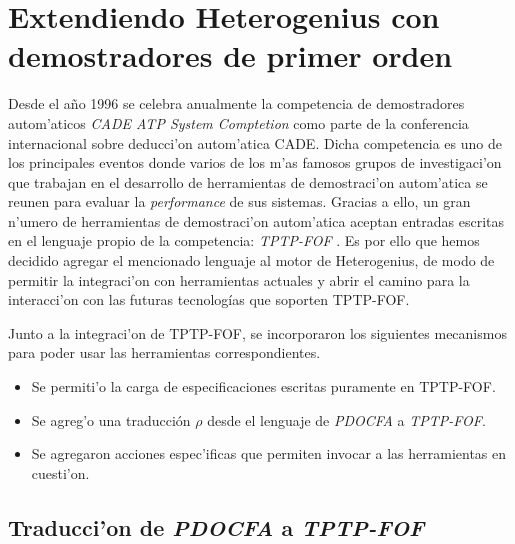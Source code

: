\section{Extendiendo Heterogenius con demostradores de primer orden}


Desde el a\~no 1996 se celebra anualmente la competencia de demostradores autom'aticos \emph{CADE ATP System Comptetion} \cite{casc} como parte de la conferencia internacional sobre deducci'on autom'atica CADE.
Dicha competencia es uno de los principales eventos donde varios de los m'as famosos grupos de investigaci'on que trabajan en el desarrollo de herramientas de demostraci'on autom'atica se reunen para evaluar la \emph{performance} de sus sistemas.
Gracias a ello, un gran n'umero de herramientas de demostraci'on autom'atica aceptan entradas escritas en el lenguaje propio de la competencia: \textit{TPTP-FOF} \cite{fof}. Es por ello que hemos decidido agregar el mencionado lenguaje al motor de Heterogenius, de modo de permitir la integraci'on con herramientas actuales y abrir el camino para la interacci'on con las futuras tecnologías que soporten TPTP-FOF.

Junto a la integraci'on de TPTP-FOF, se incorporaron los siguientes mecanismos para poder usar las herramientas correspondientes.

\begin{itemize}
\item Se permiti'o la carga de especificaciones escritas puramente en TPTP-FOF.

\item Se agreg'o una traducción $\rho$ desde el lenguaje de \textit{PDOCFA} a \textit{TPTP-FOF}. 

\item Se agregaron acciones espec'ificas que permiten invocar a las herramientas en cuesti'on.
\end{itemize}

\subsection{Traducci'on de \emph{PDOCFA} a \emph{TPTP-FOF}}

